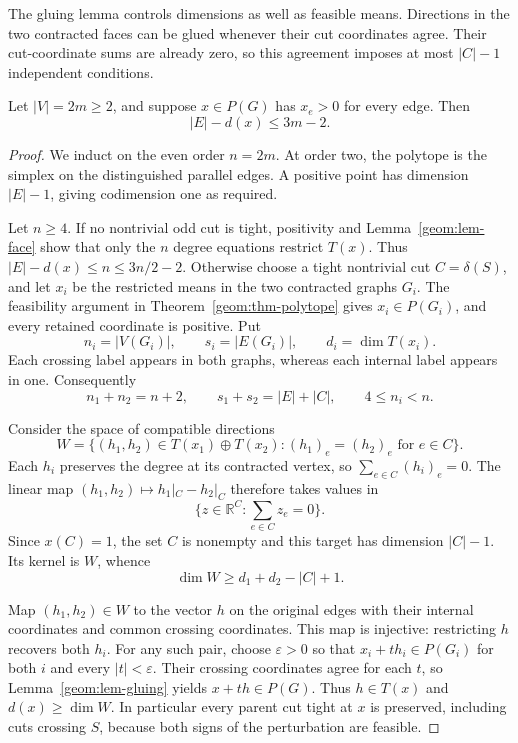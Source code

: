 The gluing lemma controls dimensions as well as feasible means.
Directions in the two contracted faces can be glued whenever their cut
coordinates agree. Their cut-coordinate sums are already zero, so this
agreement imposes at most $|C|-1$ independent conditions.

\begin{proposition}
\label{geom:prop-rank}
Let $|V|=2m\ge2$, and suppose $x\in P(G)$ has $x_e>0$ for every
edge. Then
\begin{equation}
\label{geom:eq-codimension}
 |E|-d(x)\le3m-2.
\end{equation}
\end{proposition}

\begin{proof}
We induct on the even order $n=2m$. At order two, the polytope is the
simplex on the distinguished parallel edges. A positive point has
dimension $|E|-1$, giving codimension one as required.

Let $n\ge4$. If no nontrivial odd cut is tight, positivity and
Lemma~\ref{geom:lem-face} show that only the $n$ degree equations
restrict $T(x)$. Thus $|E|-d(x)\le n\le3n/2-2$.
Otherwise choose a tight nontrivial cut $C=\delta(S)$, and let $x_i$
be the restricted means in the two contracted graphs $G_i$.
The feasibility argument in Theorem~\ref{geom:thm-polytope} gives
$x_i\in P(G_i)$, and every retained coordinate is positive. Put
\[
 n_i=|V(G_i)|,\qquad s_i=|E(G_i)|,\qquad d_i=\dim T(x_i).
\]
Each crossing label appears in both graphs, whereas each internal
label appears in one. Consequently
\begin{equation}\label{geom:eq-contraction-sizes}
 n_1+n_2=n+2,\qquad s_1+s_2=|E|+|C|,\qquad 4\le n_i<n.
\end{equation}

Consider the space of compatible directions
\[
 W=\{(h_1,h_2)\in T(x_1)\oplus T(x_2):
                         (h_1)_e=(h_2)_e\text{ for }e\in C\}.
\]
Each $h_i$ preserves the degree at its contracted vertex, so
$\sum_{e\in C}(h_i)_e=0$. The linear map
$(h_1,h_2)\mapsto h_1|_C-h_2|_C$ therefore takes values in
\[
 \{z\in\mathbb R^C:\textstyle\sum_{e\in C}z_e=0\}.
\]
Since $x(C)=1$, the set $C$ is nonempty and this target has dimension
$|C|-1$. Its kernel is $W$, whence
\[
                         \dim W\ge d_1+d_2-|C|+1.
\]

Map $(h_1,h_2)\in W$ to the vector $h$ on the original edges with
their internal coordinates and common crossing coordinates. This map
is injective: restricting $h$ recovers both $h_i$. For any such pair,
choose $\varepsilon>0$ so that $x_i+th_i\in P(G_i)$ for both $i$
and every $|t|<\varepsilon$. Their crossing coordinates agree for
each $t$, so Lemma~\ref{geom:lem-gluing} yields $x+th\in P(G)$.
Thus $h\in T(x)$ and $d(x)\ge\dim W$. In particular every parent
cut tight at $x$ is preserved, including cuts crossing $S$, because
both signs of the perturbation are feasible.


\end{proof}
